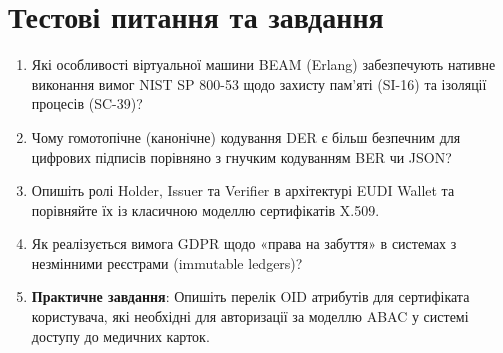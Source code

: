 \section{Тестові питання та завдання}
\begin{enumerate}
    \item Які особливості віртуальної машини BEAM (Erlang) забезпечують нативне виконання вимог NIST SP 800-53 щодо захисту пам'яті (SI-16) та ізоляції процесів (SC-39)?
    \item Чому гомотопічне (канонічне) кодування DER є більш безпечним для цифрових підписів порівняно з гнучким кодуванням BER чи JSON?
    \item Опишіть ролі Holder, Issuer та Verifier в архітектурі EUDI Wallet та порівняйте їх із класичною моделлю сертифікатів X.509.
    \item Як реалізується вимога GDPR щодо «права на забуття» в системах з незмінними реєстрами (immutable ledgers)?
    \item \textbf{Практичне завдання}: Опишіть перелік OID атрибутів для сертифіката користувача, які необхідні для авторизації за моделлю ABAC у системі доступу до медичних карток.
\end{enumerate}
